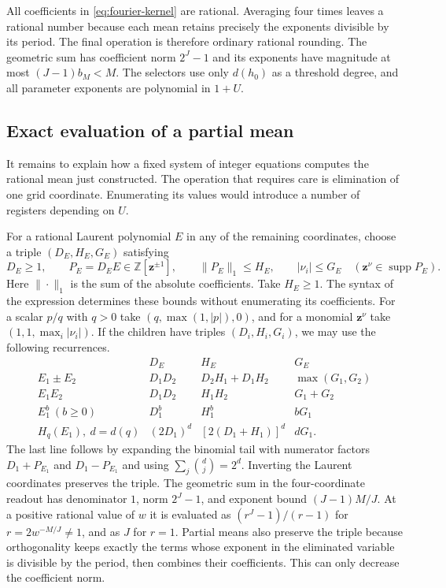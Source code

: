 \documentclass[11pt,letterpaper]{article}
\numberwithin{equation}{section}
\begin{document}
All coefficients in \eqref{eq:fourier-kernel} are rational.
Averaging four times leaves a rational number because each mean retains
precisely the exponents divisible by its period. The final operation is
therefore ordinary rational rounding. The geometric sum has coefficient
norm $2^J-1$ and its exponents have magnitude at most $(J-1)b_M<M$.
The selectors use only $d(h_0)$ as a threshold degree, and all
parameter exponents are polynomial in $1+U$.

\subsection{Exact evaluation of a partial mean}\label{sec:mean-evaluation}

It remains to explain how a fixed system of integer equations computes the rational mean just constructed. The operation that requires care is elimination of one grid coordinate. Enumerating its values would introduce a number of registers depending on $U$.

For a rational Laurent polynomial $E$ in any of the remaining coordinates, choose a triple $(D_E,H_E,G_E)$ satisfying
\[
 D_E\ge1,\qquad P_E=D_EE\in\mathbb Z[\mathbf z^{\pm1}],
 \qquad \|P_E\|_1\le H_E,\qquad
 |\nu_i|\le G_E\quad(\mathbf z^\nu\in\operatorname{supp}P_E).
\]
Here $\|\cdot\|_1$ is the sum of the absolute coefficients. Take $H_E\ge1$. The syntax of the expression determines these bounds without enumerating its coefficients. For a scalar $p/q$ with $q>0$ take $(q,\max(1,|p|),0)$, and for a monomial $\mathbf z^\nu$ take $(1,1,\max_i|\nu_i|)$. If the children have triples $(D_i,H_i,G_i)$, we may use the following recurrences.
\[
\begin{array}{c|ccc}
  &D_E&H_E&G_E\\ \hline
 E_1\mathbin{\pm} E_2&D_1D_2&D_2H_1+D_1H_2&\max(G_1,G_2)\\
 E_1 E_2&D_1D_2&H_1H_2&G_1+G_2\\
 E_1^b\ (b\ge0)&D_1^b&H_1^b&bG_1\\
 H_q(E_1),\ d=d(q)&(2D_1)^d&[2(D_1+H_1)]^d&dG_1 .
\end{array}
\]
The last line follows by expanding the binomial tail with numerator factors $D_1+P_{E_1}$ and $D_1-P_{E_1}$ and using $\sum_j\binom dj=2^d$. Inverting the Laurent coordinates preserves the triple. The geometric sum in the four-coordinate readout has denominator $1$, norm $2^J-1$, and exponent bound $(J-1)M/J$. At a positive rational value of $w$ it is evaluated as $(r^J-1)/(r-1)$ for $r=2w^{-M/J}\ne1$, and as $J$ for $r=1$. Partial means also preserve the triple because orthogonality keeps exactly the terms whose exponent in the eliminated variable is divisible by the period, then combines their coefficients. This can only decrease the coefficient norm.
\end{document}
